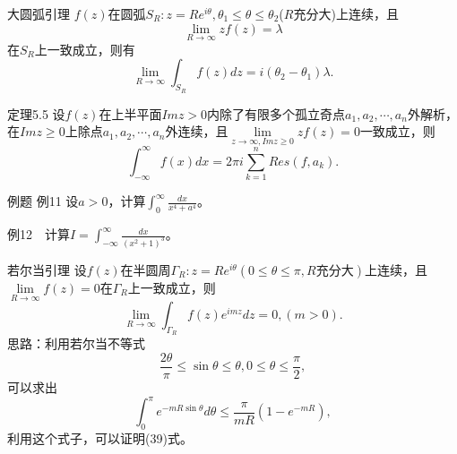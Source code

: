 \documentclass[11pt]{beamer}
\newcommand{\kong}[1][0.5]{\vspace{#1cm}}
\begin{document}
\begin{frame}{大圆弧引理}
$f(z)$在圆弧$S_R : z = Re^{i\theta}, \theta_1 \leq \theta \leq \theta_2$($R$充分大)上连续，且
\begin{equation}
\lim\limits_{R \rightarrow \infty} z f(z) = \lambda
\end{equation}
在$S_R$上一致成立，则有
\begin{equation}
\lim\limits_{R \rightarrow \infty} \int_{S_R} f(z) dz = i (\theta_2 - \theta_1) \lambda.
\end{equation}

\end{frame}

\begin{frame}{定理5.5}
设$f(z)$在上半平面$Im z >0$内除了有限多个孤立奇点$a_1, a_2, \cdots, a_n$外解析，在$Im z \geq 0$上除点$a_1, a_2, \cdots, a_n$外连续，且$\lim\limits_{z \rightarrow \infty, Im z \geq 0} zf(z) = 0$一致成立，则
\begin{equation}
\int^\infty_{-\infty} f(x) dx = 2\pi i \sum_{k=1}^{n} Res(f, a_k).
\end{equation}
\end{frame}

\begin{frame}{例题}
例11 设$a>0$，计算$\int^\infty_0 \frac{dx}{x^4 + a^4}$。

\kong[0.5]
例12　计算$I = \int^\infty_{-\infty} \frac{dx}{(x^2+1)^3}$。
\end{frame}

\begin{frame}{若尔当引理}
设$f(z)$在半圆周$\Gamma_R : z=Re^{i\theta}(0 \leq \theta \leq \pi, R \text{充分大})$上连续，且$\lim\limits_{R \rightarrow \infty} f(z) = 0$在$\Gamma_R$上一致成立，则
\begin{equation}
\lim\limits_{R \rightarrow \infty} \int_{\Gamma_R} f(z) e^{imz} dz = 0, (m>0).
\end{equation}
思路：利用若尔当不等式
\begin{equation}
\frac{2\theta}{\pi} \leq \sin \theta \leq \theta, 0 \leq \theta \leq \frac{\pi}{2},
\end{equation}
可以求出
\begin{equation}
\int^{\pi}_0 e^{-mR \sin \theta} d \theta \leq \frac{\pi}{mR}(1-e^{-mR}),
\end{equation}
利用这个式子，可以证明(39)式。
\end{frame}
\end{document}
